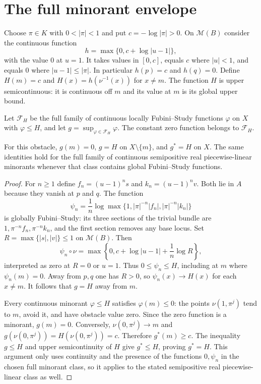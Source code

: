 \documentclass[11pt,a4paper]{amsart}
\begin{document}
\clearpage
\section{The full minorant envelope}\label{sec:envelope}

Choose $\pi\in K$ with $0<|\pi|<1$ and put $c=-\log|\pi|>0$. On $\mathcal M(B)$ consider the continuous function
\[
 h=\max\{0,c+\log|u-1|\},
\]
with the value $0$ at $u=1$. It takes values in $[0,c]$, equals $c$ where $|u|<1$, and equals $0$ where $|u-1|\leq|\pi|$. In particular $h(p)=c$ and $h(q)=0$. Define $H(m)=c$ and $H(x)=h(\nu^{-1}(x))$ for $x\neq m$. The function $H$ is upper semicontinuous: it is continuous off $m$ and its value at $m$ is its global upper bound.

Let $\mathcal F_H$ be the full family of continuous locally Fubini--Study functions $\varphi$ on $X$ with $\varphi\leq H$, and let $g=\sup_{\varphi\in\mathcal F_H}\varphi$. The constant zero function belongs to $\mathcal F_H$.

\begin{proposition}\label{prop:envelope-identity}
For this obstacle, $g(m)=0$, $g=H$ on $X\setminus\{m\}$, and $g^*=H$ on $X$. The same identities hold for the full family of continuous semipositive real piecewise-linear minorants whenever that class contains global Fubini--Study functions.
\end{proposition}

\begin{proof}
For $n\geq1$ define $f_n=(u-1)^n s$ and $k_n=(u-1)^n v$. Both lie in $A$ because they vanish at $p$ and $q$. The function
\begin{equation}\label{eq:fs-minorants}
 \psi_n=\frac1n\log\max\bigl\{1,|\pi|^{-n}|f_n|,|\pi|^{-n}|k_n|\bigr\}
\end{equation}
is globally Fubini--Study: its three sections of the trivial bundle are $1,\pi^{-n}f_n,\pi^{-n}k_n$, and the first section removes any base locus. Set $R=\max\{|s|,|v|\}\leq1$ on $\mathcal M(B)$. Then
\[
 \psi_n\circ\nu=\max\left\{0,c+\log|u-1|+\frac1n\log R\right\},
\]
interpreted as zero at $R=0$ or $u=1$. Thus $0\leq\psi_n\leq H$, including at $m$ where $\psi_n(m)=0$. Away from $p,q$ one has $R>0$, so $\psi_n(x)\to H(x)$ for each $x\neq m$. It follows that $g=H$ away from $m$.

Every continuous minorant $\varphi\leq H$ satisfies $\varphi(m)\leq0$: the points $\nu(1,\pi^j)$ tend to $m$, avoid it, and have obstacle value zero. Since the zero function is a minorant, $g(m)=0$. Conversely, $\nu(0,\pi^j)\to m$ and $g(\nu(0,\pi^j))=H(\nu(0,\pi^j))=c$. Therefore $g^*(m)\geq c$. The inequality $g\leq H$ and upper semicontinuity of $H$ give $g^*\leq H$, proving $g^*=H$. This argument only uses continuity and the presence of the functions $0,\psi_n$ in the chosen full minorant class, so it applies to the stated semipositive real piecewise-linear class as well.
\end{proof}
\end{document}
